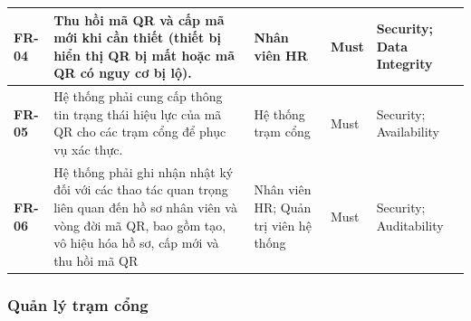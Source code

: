 \begin{longtable}{|>{\centering\arraybackslash}m{1.3cm}|>{\raggedright\arraybackslash}m{6.2cm}|>{\raggedright\arraybackslash}m{2.4cm}|>{\centering\arraybackslash}m{1.5cm}|>{\raggedright\arraybackslash}m{3.5cm}|}
    \hline
    \textbf{FR-04} & Thu hồi mã QR và cấp mã mới khi cần thiết (thiết bị hiển thị QR bị mất hoặc mã QR có nguy cơ bị lộ). & Nhân viên HR & Must & Security; Data Integrity\\
    \hline
    \textbf{FR-05} & Hệ thống phải cung cấp thông tin trạng thái hiệu lực của mã QR cho các trạm cổng để phục vụ xác thực. & Hệ thống trạm cổng & Must & Security; Availability\\
    \hline
    \textbf{FR-06} & Hệ thống phải ghi nhận nhật ký đối với các thao tác quan trọng liên quan đến hồ sơ nhân viên và vòng đời mã QR, bao gồm tạo, vô hiệu hóa hồ sơ, cấp mới và thu hồi mã QR & Nhân viên HR; Quản trị viên hệ thống & Must & Security; Auditability\\
    \hline
\end{longtable}
\endgroup

\subsubsection{Quản lý trạm cổng}

